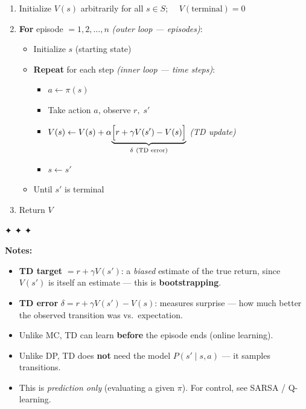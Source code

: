 \documentclass[11pt]{article}
\providecommand{\tightlist}{%
      \setlength{\itemsep}{0pt}\setlength{\parskip}{0pt}}
\begin{document}
\begin{enumerate}
\def\labelenumi{\arabic{enumi}.}
\item
  Initialize \(V(s)\) arbitrarily for all \(s \in S\);
  \(\quad V(\text{terminal}) = 0\)
\item
  \textbf{For} episode \(= 1, 2, \ldots, n\) \emph{(outer loop ---
  episodes)}:

  \begin{itemize}
  \tightlist
  \item
    Initialize \(s\) (starting state)
  \item
    \textbf{Repeat} for each step \emph{(inner loop --- time steps)}:

    \begin{itemize}
    \tightlist
    \item
      \(a \leftarrow \pi(s)\)
    \item
      Take action \(a\), observe \(r,\; s'\)
    \item
      \(\displaystyle V(s) \leftarrow V(s) + \alpha\!\underbrace{\Bigl[r + \gamma V(s') - V(s)\Bigr]}_{\delta\ (\text{TD error})}\)
      \emph{(TD update)}
    \item
      \(s \leftarrow s'\)
    \end{itemize}
  \item
    Until \(s'\) is terminal
  \end{itemize}
\item
  Return \(V\)
\end{enumerate}

✦ ✦ ✦

\textbf{Notes:}

\begin{itemize}
\tightlist
\item
  \textbf{TD target} \(= r + \gamma V(s')\): a \emph{biased} estimate of
  the true return, since \(V(s')\) is itself an estimate --- this is
  \textbf{bootstrapping}.
\item
  \textbf{TD error} \(\delta = r + \gamma V(s') - V(s)\): measures
  surprise --- how much better the observed transition was
  vs.~expectation.
\item
  Unlike MC, TD can learn \textbf{before} the episode ends (online
  learning).
\item
  Unlike DP, TD does \textbf{not} need the model \(P(s' \mid s,a)\) ---
  it samples transitions.
\item
  This is \emph{prediction only} (evaluating a given \(\pi\)). For
  control, see SARSA / Q-learning.
\end{itemize}
\end{document}
